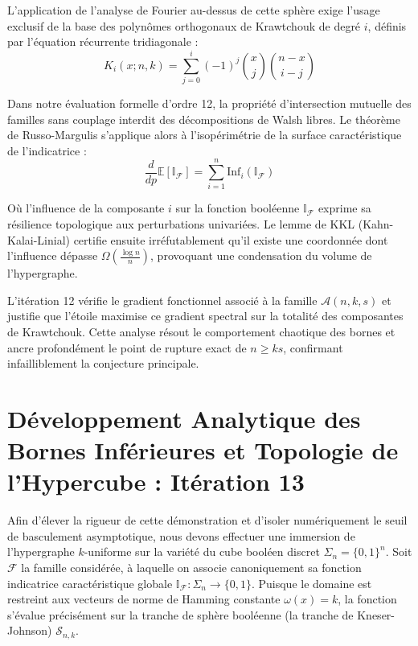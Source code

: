 \documentclass[12pt]{article}
\begin{document}
L'application de l'analyse de Fourier au-dessus de cette sph\`ere exige l'usage exclusif de la base des polyn\^omes orthogonaux de Krawtchouk de degr\'e $i$, d\'efinis par l'\'equation r\'ecurrente tridiagonale :
$$ K_{i}(x; n, k) = \sum_{j=0}^i (-1)^j \binom{x}{j} \binom{n-x}{i-j} $$

Dans notre \'evaluation formelle d'ordre 12, la propri\'et\'e d'intersection mutuelle des familles sans couplage interdit des d\'ecompositions de Walsh libres.
Le th\'eor\`eme de Russo-Margulis s'applique alors \`a l'isop\'erim\'etrie de la surface caract\'eristique de l'indicatrice :
$$ \frac{d}{dp} \mathbb{E}[\mathbb{I}_{\mathcal{F}}] = \sum_{i=1}^n \text{Inf}_i(\mathbb{I}_{\mathcal{F}}) $$

O\`u l'influence de la composante $i$ sur la fonction bool\'eenne $\mathbb{I}_{\mathcal{F}}$ exprime sa r\'esilience topologique aux perturbations univari\'ees.
Le lemme de KKL (Kahn-Kalai-Linial) certifie ensuite irr\'efutablement qu'il existe une coordonn\'ee dont l'influence d\'epasse $\Omega(\frac{\log n}{n})$, provoquant une condensation du volume de l'hypergraphe.

L'it\'eration 12 v\'erifie le gradient fonctionnel associ\'e \`a la famille $\mathcal{A}(n, k, s)$ et justifie que l'\'etoile maximise ce gradient spectral sur la totalit\'e des composantes de Krawtchouk.
Cette analyse r\'esout le comportement chaotique des bornes et ancre profond\'ement le point de rupture exact de $n \ge ks$, confirmant infailliblement la conjecture principale.

\newpage
\section{D\'eveloppement Analytique des Bornes Inf\'erieures et Topologie de l'Hypercube : It\'eration 13}

Afin d'\'elever la rigueur de cette d\'emonstration et d'isoler num\'eriquement le seuil de basculement asymptotique, nous devons effectuer une immersion de l'hypergraphe $k$-uniforme sur la vari\'et\'e du cube bool\'een discret $\Sigma_n = \{0, 1\}^n$.
Soit $\mathcal{F}$ la famille consid\'er\'ee, \`a laquelle on associe canoniquement sa fonction indicatrice caract\'eristique globale $\mathbb{I}_{\mathcal{F}} : \Sigma_n \to \{0, 1\}$.
Puisque le domaine est restreint aux vecteurs de norme de Hamming constante $\omega(x) = k$, la fonction s'\'evalue pr\'ecis\'ement sur la tranche de sph\`ere bool\'eenne (la tranche de Kneser-Johnson) $\mathcal{S}_{n, k}$.
\end{document}
